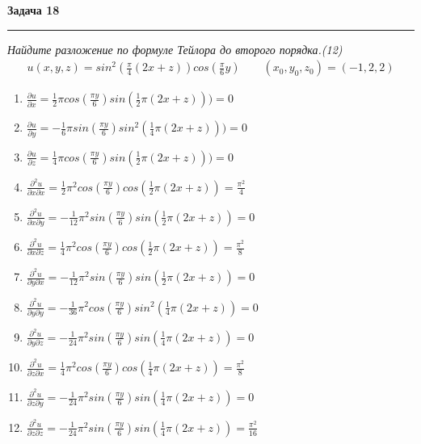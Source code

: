 \documentclass[a4paper,11pt]{article}
\begin{document}
\textbf{\large Задача 18}
\medskip\hrule\medskip
\textit{Найдите разложение по формуле Тейлора до второго порядка.(12)}
\begin{gather*}
u(x, y, z) = sin^2(\frac{\pi}4(2x + z))cos(\frac{\pi}6y) \qquad (x_0, y_0, z_0) = (-1, 2, 2)
\end{gather*}
\begin{enumerate}
	\item $
	\frac{\partial u}{\partial x} = \frac12\pi cos(\frac{\pi y}{6})sin(\frac12 \pi (2x + z))) = 0  
	$
	
	\item $
	\frac{\partial u}{\partial y} = -\frac16 \pi sin(\frac{\pi y}{6}) sin^2(\frac14  \pi (2x + z))) = 0  
	$
	
	\item $
	\frac{\partial u}{\partial z} = \frac14\pi cos(\frac{\pi y}{6})sin(\frac12 \pi (2x + z)))   = 0  
	$
	
	\item $ \frac{\partial^2 u}{\partial x \partial x} = \frac12 \pi^2 cos(\frac{\pi y}{6}) cos(\frac12 \pi (2x + z)) = \frac{\pi^2}{4}	
	$
	
	\item $ \frac{\partial^2 u}{\partial x \partial y} = -\frac1{12} \pi^2 sin(\frac{\pi y}{6}) sin(\frac12 \pi (2x + z)) = 0
	$
	
	\item $ \frac{\partial^2 u}{\partial x \partial z} = \frac14 \pi^2 cos(\frac{\pi y}{6}) cos(\frac12 \pi (2x + z)) = \frac{\pi^2}{8}
	$
	
	\item $ \frac{\partial^2 u}{\partial y \partial x} = -\frac1{12} \pi^2 sin(\frac{\pi y}{6}) sin(\frac12 \pi (2x + z)) = 0
	$
	
	\item $ \frac{\partial^2 u}{\partial y \partial y} = -\frac1{36} \pi^2 cos(\frac{\pi y}{6}) sin^2(\frac14 \pi (2x + z)) = 0
	$
	
	\item $ \frac{\partial^2 u}{\partial y \partial z} = -\frac1{24} \pi^2 sin(\frac{\pi y}{6}) sin(\frac14 \pi (2x + z)) = 0
	$
	
	\item $ \frac{\partial^2 u}{\partial z \partial x} = \frac1{4} \pi^2 cos(\frac{\pi y}{6}) cos(\frac14 \pi (2x + z)) = \frac{\pi^2}{8}
	$
	
	\item $ \frac{\partial^2 u}{\partial z \partial y} = -\frac1{24} \pi^2 sin(\frac{\pi y}{6}) sin(\frac14 \pi (2x + z)) = 0
	$
	
	\item $ \frac{\partial^2 u}{\partial z \partial z} = -\frac1{24} \pi^2 sin(\frac{\pi y}{6}) sin(\frac14 \pi (2x + z)) = \frac{\pi^2}{16}
	$
\end{enumerate}
\end{document}
